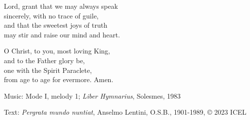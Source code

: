 \hymn



\begin{underhymnverse}
Lord, grant that we may always speak\\
sincerely, with no trace of guile,\\
and that the sweetest joys of truth\\
may stir and raise our mind and heart.

O Christ, to you, most loving King,\\
and to the Father glory be,\\
one with the Spirit Paraclete,\\
from age to age for evermore. Amen.
\end{underhymnverse}

\begin{hymnsource}
Music: Mode I, melody 1; \emph{Liber Hymnarius}, Solesmes, 1983

Text: \emph{Pergrata mundo nuntiat}, Anselmo Lentini, O.S.B., 1901-1989, © 2023 ICEL
\end{hymnsource}
